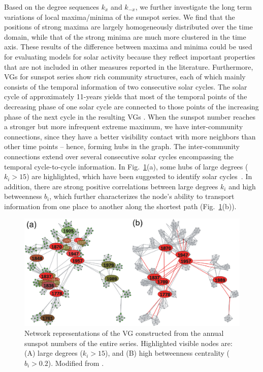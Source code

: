 		Based on the degree sequences $k_x$ and $k_{-x}$, we further investigate the long term variations of local maxima/minima of the sunspot series. We find that the positions of strong maxima are largely homogeneously distributed over the time domain, while that of the strong minima are much more clustered in the time axis. These results of the difference between maxima and minima could be used for evaluating models for solar activity because they reflect important properties that are not included in other measures reported in the literature. Furthermore, VGs for sunspot series show rich community structures, each of which mainly consists of the temporal information of two consecutive solar cycles. The solar cycle of approximately 11-years yields that most of the temporal points of the decreasing phase of one solar cycle are connected to those points of the increasing phase of the next cycle in the resulting VGs \cite{Zou2014a}. When the sunspot number reaches a stronger but more infrequent extreme maximum, we have inter-community connections, since they have a better visibility contact with more neighbors than other time points -- hence, forming hubs in the graph. The inter-community connections extend over several consecutive solar cycles encompassing the temporal cycle-to-cycle information. In Fig.~\ref{year_sspnDegBet}(a), some hubs of large degrees ($k_i > 15$) are highlighted, which have been suggested to identify solar cycles~\cite{Zou2014a}. In addition, there are strong positive correlations between large degrees $k_i$ and high betweenness $b_i$, which further characterizes the node's ability to transport information from one place to another along the shortest path (Fig.~\ref{year_sspnDegBet}(b)).
		\begin{figure}[htbp]
  		\centering
   			\includegraphics[width=\columnwidth]{Chapter06_Applications/network261_degree_between.eps}
			\caption{Network representations of the VG constructed from the annual sunspot numbers of the entire series. Highlighted visible nodes are: (A) large degrees ($k_i>15$), and (B) high betweenness centrality ($b_i>0.2$). Modified from \cite{Zou2014a}. } \label{year_sspnDegBet}
		\end{figure}


